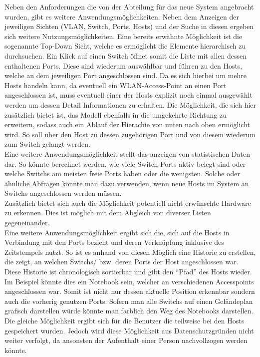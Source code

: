 Neben den Anforderungen die von der Abteilung für das neue System angebracht wurden, gibt es weitere Anwendungsmöglichkeiten. Neben dem Anzeigen der jeweiligen Sichten (VLAN, Switch, Ports, Hosts) und der Suche in diesen ergeben sich weitere Nutzungsmöglichkeiten. Eine bereits erwähnte Möglichkeit ist die sogenannte Top-Down Sicht, welche es ermöglicht die Elemente hierarchisch zu durchsuchen. Ein Klick auf einen Switch öffnet somit die Liste mit allen dessen enthaltenen Ports. Diese sind wiederum auswählbar und führen zu den Hosts, welche an dem jeweiligen Port angeschlossen sind. Da es sich hierbei um mehre Hosts handeln kann, da eventuell ein WLAN-Access-Point an einen Port angeschlossen ist, muss eventuell einer der Hosts explizit noch einmal ausgewählt werden um dessen Detail Informationen zu erhalten. Die Möglichkeit, die sich hier zusätzlich bietet ist, das Modell ebenfalls in die umgekehrte Richtung zu erweitern, sodass auch ein Ablauf der Hierachie von unten nach oben ermöglicht wird. So soll über den Host zu dessen zugehörigen Port und von diesem wiederum zum Switch gelangt werden.\\
Eine weitere Anwendungsmöglichkeit stellt das anzeigen von statistischen Daten dar. So könnte berechnet werden, wie viele Switch-Ports aktiv belegt sind oder welche Switchs am meisten freie Ports haben oder die wenigsten. Solche oder ähnliche Abfragen könnte man dazu verwenden, wenn neue Hosts im System an Switchs angeschlossen werden müssen.\\ Zusätzlich bietet sich auch die Möglichkeit potentiell nicht erwünschte Hardware zu erkennen.  Dies ist möglich mit dem Abgleich von diverser Listen gegeneinander.\\
Eine weitere Anwendungsmöglichkeit ergibt sich die, sich auf die Hosts in Verbindung mit den Ports  bezieht und deren Verknüpfung inklusive des Zeitstempels nutzt. So ist es anhand von diesen Möglich eine Historie zu erstellen, die zeigt, an welchen Switchs/ bzw. deren Ports der Host angeschlossen war. Diese Historie ist chronologisch sortierbar und gibt den “Pfad” des Hosts wieder. Im Beispiel könnte dies ein Notebook sein, welcher an verschiedenen Accesspoints angeschlossen war. Somit ist nicht nur dessen aktuelle Position erkennbar sondern auch die vorherig genutzen Ports. Sofern man alle Switchs auf einen Geländeplan grafisch darstellen würde könnte man farblich den Weg des Notebooks darstellen.
Die gleiche Möglichkeit ergibt sich für die Benutzer die teilweise bei den Hosts gespeichert wurden. Jedoch wird diese Möglichkeit aus Datenschutzgründen nicht weiter verfolgt, da ansonsten der Aufenthalt einer Person nachvollzogen werden könnte.\\
